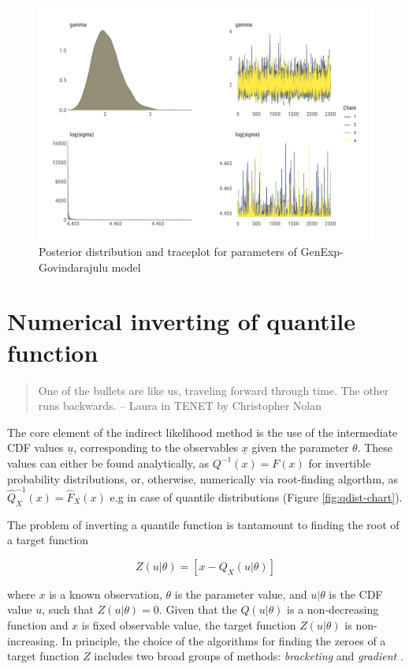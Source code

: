 \documentclass[
  12pt,
]{article}
\begin{document}
\begin{figure}

{\centering \includegraphics[width=0.8\linewidth]{ilbm_article_files/figure-latex/unnamed-chunk-6-1} 

}

\caption{Posterior distribution and traceplot for parameters of GenExp-Govindarajulu model}\label{fig:unnamed-chunk-6}
\end{figure}

\hypertarget{numerical-inverting-of-quantile-function}{%
\section{Numerical inverting of quantile function}\label{numerical-inverting-of-quantile-function}}

\begin{quotation}
One of the bullets are like us, traveling forward through time. The other runs backwards.
-- Laura in TENET by Christopher Nolan
\end{quotation}

The core element of the indirect likelihood method is the use of the intermediate CDF values \(\underline{u}\), corresponding to the observables \(\underline{x}\) given the parameter \(\theta\). These values can either be found analytically, as \(Q^{-1}(x)=F(x)\) for invertible probability distributions, or, otherwise, numerically via root-finding algorthm, as \(\widehat{Q}^{-1}_X(x)=\widehat{F}_X(x)\) e.g in case of quantile distributions (Figure \ref{fig:qdist-chart}).

The problem of inverting a quantile function is tantamount to finding the root of a target function

\[
Z(u|\theta)=[x-Q_X(u|\theta)]
\]

where \(x\) is a known observation, \(\theta\) is the parameter value, and \(u|\theta\) is the CDF value \(u\), such that \(Z(u|\theta)=0\). Given that the \(Q(u|\theta)\) is a non-decreasing function and \(x\) is fixed observable value, the target function \(Z(u|\theta)\) is non-increasing. In principle, the choice of the algorithms for finding the zeroes of a target function \(Z\) includes two broad groups of methods: \emph{bracketing} and \emph{gradient} \citep{atkinson2008IntroductionNumericalAnalysis, burden2011NumericalAnalysis}.
\end{document}
